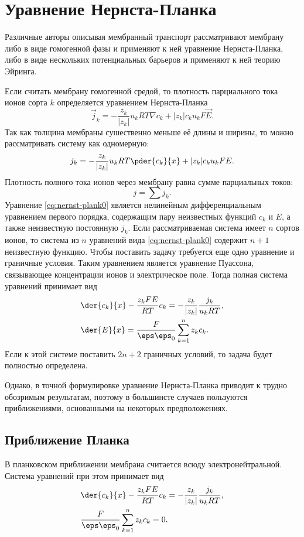 \documentclass{hedwork}
\begin{document}
\tableofcontents
\section{Уравнение Нернста-Планка}
    Различные авторы описывая мембранный транспорт рассматривают мембрану либо в
    виде гомогенной фазы и применяют к ней уравнение Нернста-Планка, либо в виде
    нескольких потенциальных барьеров и применяют к ней теорию Эйринга.

    Если считать мембрану гомогенной средой, то плотность парциального тока
    ионов сорта \(k\) определяется уравнением Нернста-Планка
    \[
        \vec{j}_k = -\frac{z_k}{|z_k|}u_kRT\nabla c_k + |z_k|c_ku_kF\vec{E}.
    \]
    Так как толщина мембраны сушественно меньше её длины и ширины, то можно
    рассматривать систему как одномерную:
    \begin{equation}
        j_k = -\frac{z_k}{|z_k|}u_kRT\pder{c_k}{x} + |z_k|c_ku_kFE.
        \label{eq:nernst-plank0}
    \end{equation}
    Плотность полного тока ионов через мембрану равна сумме парциальных токов:
    \[
        j = \sum j_k.
    \]
    Уравнение \eqref{eq:nernst-plank0} является нелинейным дифференциальным
    уравнением первого порядка, содержащим пару неизвестных функций \( c_k \) и
    \( E \), а также неизвестную постоянную \( j_k \). Если рассматриваемая
    система имеет \( n \) сортов ионов, то система из \( n \) уравнений вида
    \eqref{eq:nernst-plank0} содержит \( n + 1 \) неизвестную функцию. Чтобы
    поставить задачу требуется еще одно уравнение и граничные условия. Таким
    уравнением является уравнение Пуассона, связывающее концентрации ионов и
    электрическое поле. Тогда полная система уравнений принимает вид
    \begin{align*}
        & \der{c_k}{x} - \frac{z_kFE}{RT}c_k =
            -\frac{z_k}{|z_k|}\frac{j_k}{u_kRT}, \\
        & \der{E}{x} = \frac{F}{\eps\eps_0}\sum_{k=1}^n z_k c_k.
    \end{align*}
    Если к этой системе поставить \( 2n+2 \) граничных условий, то задача будет
    полностью определена.
    
    Однако, в точной формулировке уравнение Нернста-Планка приводит к трудно
    обозримым результатам, поэтому в большинсте случаев пользуются
    приближениями, основанными на некоторых предположениях.
    
    \subsection{Приближение Планка}
    В планковском приближении мембрана считается всюду электронейтральной.
    Система уравнений при этом принимает вид
    \begin{align*}
        & \der{c_k}{x} - \frac{z_kFE}{RT}c_k =
            -\frac{z_k}{|z_k|}\frac{j_k}{u_kRT}, \\
        & \frac{F}{\eps\eps_0}\sum_{k=1}^n z_k c_k = 0.
    \end{align*}
\end{document}
